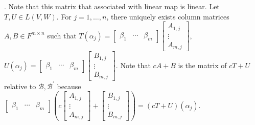 \documentclass[8pt]{beamer}
\newcommand{\mc}[1]{\mathcal{#1}}
\begin{document}
\begin{frame}{.}
    Note that this matrix that associated with linear map is linear.
    Let $T, U \in L(V,W)$.
    For $j =1,\dots, n$, there uniquely exists column matrices $A, B \in F^{m \times n}$ such that $T(\alpha_j) = \left[\begin{matrix} \beta_1 & \cdots & \beta_m \end{matrix}\right] \left[\begin{matrix} A_{1,j} \\ \vdots \\ A_{m,j} \end{matrix}\right]$, $U(\alpha_j) = \left[\begin{matrix} \beta_1 & \cdots & \beta_m \end{matrix}\right] \left[\begin{matrix} B_{1,j} \\ \vdots \\ B_{m,j} \end{matrix}\right]$. Note that $cA + B$ is the matrix of $cT + U$ relative to $\mc{B}, \mc{B}^\prime$ because $\left[\begin{matrix}
    \beta_1 & \cdots & \beta_m
    \end{matrix}\right] \left(c \left[\begin{matrix}
        A_{1,j} \\ \vdots \\ A_{m,j}
    \end{matrix}\right] + \left[\begin{matrix}
        B_{1,j} \\ \vdots \\ B_{m,j}
    \end{matrix}\right]\right) = (cT + U)(\alpha_j)$.
\end{frame}
\end{document}
